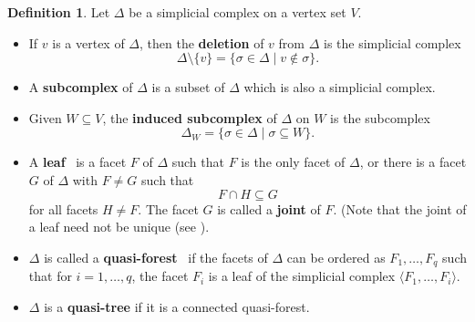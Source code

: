 \documentclass[11pt]{article}
\theoremstyle{definition}
\newtheorem{defi}[theo]{Definition}
\numberwithin{equation}{section}
\newcommand{\D}{\Delta}
\newcommand{\tuple}[1]{\langle #1 \rangle}
\begin{document}
\begin{defi}
\label{d:defs} Let $\D$ be a simplicial complex on a vertex set $V$.
\begin{itemize}
\item If $v$ is a vertex of $\D$, then the {\bf deletion} of $v$ from
  $\D$ is the simplicial complex
$$\D \setminus \{v\} = \{ \sigma \in \D \mid v \not \in \sigma\}.$$

\item A {\bf subcomplex} of $\D$ is a subset of $\D$ which is also a
  simplicial complex.

\item Given $W \subseteq V$, the {\bf induced subcomplex} of $\D$ on
  $W$ is the subcomplex
$$\D_W=\{ \sigma \in \D \mid \sigma \subseteq W\}.$$

\item A {\bf leaf}~\cite{F02} is a facet $F$ of $\D$ such that $F$ is
the only facet of $\D$, or there is a facet $G$ of $\D$ with $F\ne G$
such that
$$F\cap H \subseteq G$$ for all facets $H \neq F$. The facet $G$ is
called a {\bf joint} of $F$. (Note that the joint of a leaf need not
be unique \textup{(}see \cite{F02}\textup{)}.

\item $\D$ is called a {\bf quasi-forest}~\cite{Z} if the facets of
$\D$ can be ordered as $F_1,\ldots, F_q$ such that for
$i=1,\ldots,q$, the facet $F_i$ is a leaf of the simplicial complex
$\tuple{F_1,\ldots,F_i}$.

\item $\D$ is a {\bf quasi-tree} if it is a connected quasi-forest.
\end{itemize}
\end{defi}
\end{document}
